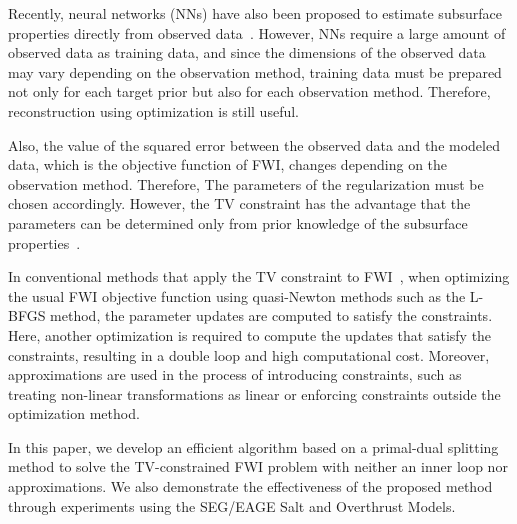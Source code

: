 Recently, neural networks (NNs) have also been proposed to estimate subsurface properties directly from observed data~\cite{ML-FWI0,ML-FWI1,ML-FWI2,ML-FWI3}.
However, NNs require a large amount of observed data as training data, and since the dimensions of the observed data may vary depending on the observation method, training data must be prepared not only for each target prior but also for each observation method.
Therefore, reconstruction using optimization is still useful.

Also, the value of the squared error between the observed data and the modeled data, which is the objective function of FWI, changes depending on the observation method.
Therefore, The parameters of the regularization must be chosen accordingly.
However, the TV constraint has the advantage that the parameters can be determined only from prior knowledge of the subsurface properties~\cite{constraints-vs-penalties-in-FWI}.

In conventional methods that apply the TV constraint to FWI~\cite{FWI-with-TV-constraint,FWI-with-TV-constraint2}, when optimizing the usual FWI objective function using quasi-Newton methods such as the L-BFGS method, the parameter updates are computed to satisfy the constraints.
Here, another optimization is required to compute the updates that satisfy the constraints, resulting in a double loop and high computational cost.
Moreover, approximations are used in the process of introducing constraints, such as treating non-linear transformations as linear or enforcing constraints outside the optimization method.

In this paper, we develop an efficient algorithm based on a primal-dual splitting method to solve the TV-constrained FWI problem with neither an inner loop nor approximations.
We also demonstrate the effectiveness of the proposed method through experiments using the SEG/EAGE Salt and Overthrust Models.







